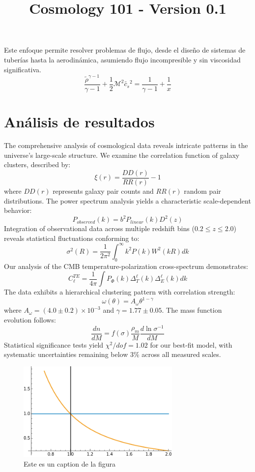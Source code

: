 \documentclass{article}\usepackage{graphicx} \usepackage{amsmath} \usepackage{colortbl}\title{Cosmology 101 - Version 0.1}
\begin{document}
Este enfoque permite resolver problemas de flujo, desde el diseño de sistemas de tuberías hasta la aerodinámica, asumiendo flujo incompresible y sin viscosidad significativa. \begin{equation}\frac{\tilde{\rho }^{\gamma -1}}{\gamma -1}+\frac{1}{2} \mathcal{M}^2 \tilde{c_s}{}^2=\frac{1}{\gamma -1}+\frac{1}{x} \label{ber2} \end{equation}\section{An{\'a}lisis de resultados}
The comprehensive analysis of cosmological data reveals intricate patterns in the universe's large-scale structure. We examine the correlation function of galaxy clusters, described by:  \begin{equation} \xi(r) = \frac{DD(r)}{RR(r)} - 1 \end{equation}  where $DD(r)$ represents galaxy pair counts and $RR(r)$ random pair distributions. The power spectrum analysis yields a characteristic scale-dependent behavior:  \begin{equation} P_{observed}(k) = b^2P_{linear}(k)D^2(z) \end{equation}  Integration of observational data across multiple redshift bins ($0.2 \leq z \leq 2.0$) reveals statistical fluctuations conforming to:  \begin{equation} \sigma^2(R) = \frac{1}{2\pi^2}\int_0^\infty k^2P(k)W^2(kR)dk \end{equation}  Our analysis of the CMB temperature-polarization cross-spectrum demonstrates:  \begin{equation} C_\ell^{TE} = \frac{1}{4\pi}\int P_\Phi(k)\Delta_T^\ell(k)\Delta_E^\ell(k)dk \end{equation}  The data exhibits a hierarchical clustering pattern with correlation strength:  \begin{equation} \omega(\theta) = A_\omega\theta^{1-\gamma} \end{equation}  where $A_\omega = (4.0 \pm 0.2) \times 10^{-3}$ and $\gamma = 1.77 \pm 0.05$. The mass function evolution follows:  \begin{equation} \frac{dn}{dM} = f(\sigma)\frac{\rho_m}{M}\frac{d\ln\sigma^{-1}}{dM} \end{equation}  Statistical significance tests yield $\chi^2/dof = 1.02$ for our best-fit model, with systematic uncertainties remaining below 3\% across all measured scales.
\begin{figure}
\includegraphics[width=8.0cm]{images/imagen1.png}
\caption{Este es un caption de la figura}\label{pl1}
\end{figure}
\end{document}
